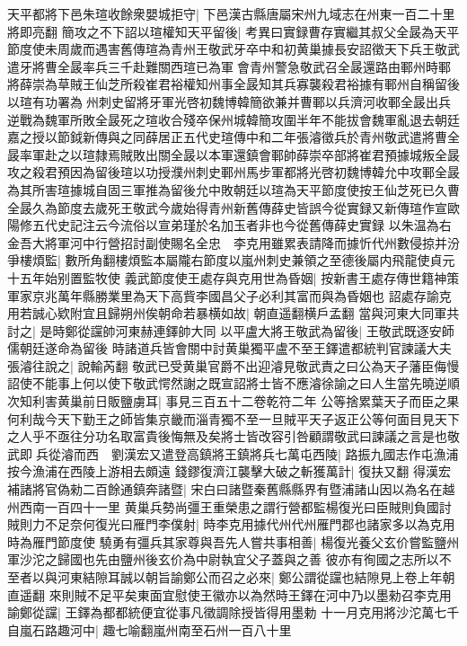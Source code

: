 天平都將下邑朱瑄收餘衆嬰城拒守|{
	下邑漢古縣唐屬宋州九域志在州東一百二十里將即亮翻}
簡攻之不下詔以瑄權知天平留後|{
	考異曰實録曹存實繼其叔父全晸為天平節度使未周歲而遇害舊傳瑄為青州王敬武牙卒中和初黄巢據長安詔徵天下兵王敬武遣牙將曹全晸率兵三千赴難關西瑄已為軍會青州警急敬武召全晸還路由鄆州時鄆將薛崇為草賊王仙芝所殺崔君裕權知州事全晸知其兵寡襲殺君裕據有鄆州自稱留後以瑄有功署為州刺史留將牙軍光啓初魏博韓簡欲兼并曹鄆以兵濟河收鄆全晸出兵逆戰為魏軍所敗全晸死之瑄收合殘卒保州城韓簡攻圍半年不能拔會魏軍亂退去朝廷嘉之授以節鉞新傳與之同薛居正五代史瑄傳中和二年張濬徵兵於青州敬武遣將曹全晸率軍赴之以瑄隸焉賊敗出關全晸以本軍還鎮會鄆帥薛崇卒部將崔君預據城叛全晸攻之殺君預因為留後瑄以功授濮州刺史鄆州馬步軍都將光啓初魏博韓允中攻鄆全晸為其所害瑄據城自固三軍推為留後允中敗朝廷以瑄為天平節度使按王仙芝死已久曹全晸久為節度去歲死王敬武今歲始得青州新舊傳薛史皆誤今從實録又新傳瑄作宣歐陽修五代史記注云今流俗以宣弟瑾於名加玉者非也今從舊傳薛史實録}
以朱温為右金吾大將軍河中行營招討副使賜名全忠　李克用雖累表請降而據忻代州數侵掠并汾爭樓煩監|{
	數所角翻樓煩監本屬隴右節度以嵐州刺史兼領之至德後屬内飛龍使貞元十五年始别置監牧使}
義武節度使王處存與克用世為昏姻|{
	按新書王處存傳世籍神策軍家京兆萬年縣勝業里為天下高貲李國昌父子必利其富而與為昏姻也}
詔處存諭克用若誠心欵附宜且歸朔州俟朝命若暴横如故|{
	朝直遥翻横戶孟翻}
當與河東大同軍共討之|{
	是時鄭從讜帥河東赫連鐸帥大同}
以平盧大將王敬武為留後|{
	王敬武既逐安師儒朝廷遂命為留後}
時諸道兵皆會關中討黄巢獨平盧不至王鐸遣都統判官諫議大夫張濬往說之|{
	說輸芮翻}
敬武已受黄巢官爵不出迎濬見敬武責之曰公為天子藩臣侮慢詔使不能事上何以使下敬武愕然謝之既宣詔將士皆不應濬徐諭之曰人生當先曉逆順次知利害黄巢前日販鹽虜耳|{
	事見三百五十二卷乾符二年}
公等捨累葉天子而臣之果何利哉今天下勤王之師皆集京畿而淄青獨不至一旦賊平天子返正公等何面目見天下之人乎不亟往分功名取富貴後悔無及矣將士皆改容引咎顧謂敬武曰諫議之言是也敬武即兵從濬而西　劉漢宏又遣登高鎮將王鎮將兵七萬屯西陵|{
	路振九國志作屯漁浦按今漁浦在西陵上游相去頗遠}
錢鏐復濟江襲擊大破之斬獲萬計|{
	復扶又翻}
得漢宏補諸將官偽勑二百餘通鎮奔諸暨|{
	宋白曰諸暨秦舊縣縣界有暨浦諸山因以為名在越州西南一百四十一里}
黄巢兵勢尚彊王重榮患之謂行營都監楊復光曰臣賊則負國討賊則力不足奈何復光曰雁門李僕射|{
	時李克用據代州代州雁門郡也諸家多以為克用時為雁門節度使}
驍勇有彊兵其家尊與吾先人嘗共事相善|{
	楊復光養父玄价嘗監鹽州軍沙沱之歸國也先由鹽州後玄价為中尉執宜父子蓋與之善}
彼亦有徇國之志所以不至者以與河東結隙耳誠以朝旨諭鄭公而召之必來|{
	鄭公謂從讜也結隙見上卷上年朝直遥翻}
來則賊不足平矣東面宜慰使王徽亦以為然時王鐸在河中乃以墨勑召李克用諭鄭從讜|{
	王鐸為都都統便宜從事凡徵調除授皆得用墨勅}
十一月克用將沙沱萬七千自嵐石路趣河中|{
	趣七喻翻嵐州南至石州一百八十里}
